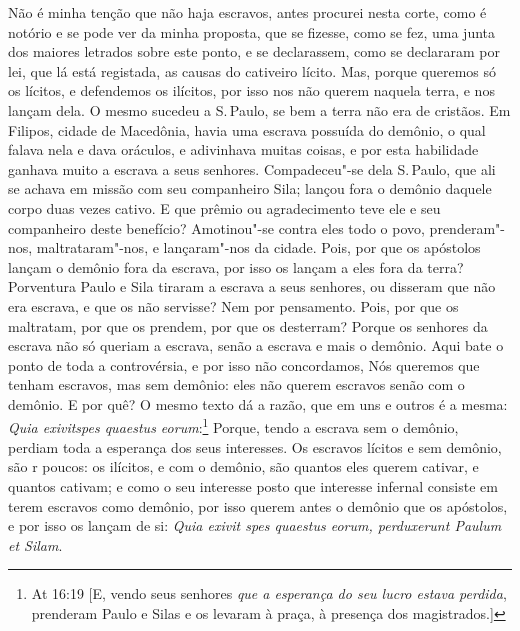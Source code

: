 Não é minha tenção que não haja escravos, antes procurei nesta corte,
como é notório e se pode ver da minha proposta, que se fizesse, como se
fez, uma junta dos maiores letrados sobre este ponto, e se declarassem,
como se declararam por lei, que lá está
registada, as causas do cativeiro lícito. Mas, porque queremos só os
lícitos, e defendemos os ilícitos, por isso nos não querem naquela
terra, e nos lançam dela. O mesmo sucedeu a S.\,Paulo, se bem a terra não
era de cristãos. Em Filipos, cidade de Macedônia, havia uma escrava
possuída do demônio, o qual falava nela e dava oráculos, e adivinhava
muitas coisas, e por esta habilidade ganhava muito a escrava a seus
senhores. Compadeceu"-se dela S.\,Paulo, que ali se achava em missão com
seu companheiro Sila; lançou fora o demônio daquele corpo duas vezes
cativo. E que prêmio ou agradecimento teve ele e seu companheiro deste
benefício? Amotinou"-se contra eles todo o povo, prenderam"-nos,
maltrataram"-nos, e lançaram"-nos da cidade. Pois, por que os apóstolos
lançam o demônio fora da escrava, por isso os lançam a eles fora da
terra? Porventura Paulo e Sila tiraram a escrava a seus senhores, ou
disseram que não era escrava, e que os não servisse? Nem por pensamento.
Pois, por que os maltratam, por que os prendem, por que os desterram?
Porque os senhores da escrava não só queriam a escrava, senão a escrava
e mais o demônio. Aqui bate o ponto de toda a controvérsia, e por isso
não concordamos, Nós queremos que tenham escravos, mas sem demônio: eles
não querem escravos senão com o demônio. E por quê? O mesmo texto dá a
razão, que em uns e outros é a mesma: \emph{Quia exivitspes quaestus
eorum}:\footnote{At 16:19 [E, vendo seus senhores \emph{que a esperança do seu lucro estava perdida}, prenderam Paulo e Silas e os levaram à praça, à presença dos magistrados.]} Porque, tendo a escrava sem o demônio, perdiam toda
a esperança dos seus interesses. Os escravos lícitos e sem demônio, são
r poucos: os ilícitos, e com o demônio, são quantos eles querem cativar,
e quantos cativam; e como o seu interesse posto que interesse infernal
consiste em terem escravos como demônio, por isso querem antes o demônio
que os apóstolos, e por isso os lançam de si: \emph{Quia exivit spes
quaestus eorum, perduxerunt Paulum et Silam}.

